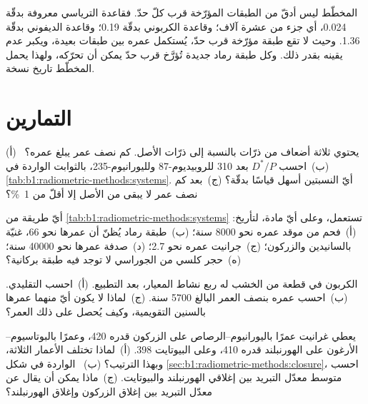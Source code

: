 المخطّط ليس أدقّ من الطبقات المؤرّخة قرب كلّ حدّ. فقاعدة الترياسي معروفة بدقّة \qty{0.024}{\Myr}، أي جزء من عشرة آلاف؛ وقاعدة الكربوني بدقّة \qty{0.19}{\Myr}؛ وقاعدة الديفوني بدقّة \qty{1.36}{\Myr}. وحيث لا تقع طبقة مؤرّخة قرب حدّ، يُستكمل عمره بين طبقات بعيدة، ويكبر عدم يقينه بقدر ذلك. وكل طبقة رماد جديدة تُؤرَّخ قرب حدّ يمكن أن تحرّكه، ولهذا يحمل المخطّط تاريخ نسخة.

\section{التمارين}

\begin{exercise}[$\star$]\label{exo:b1:radiometric-methods:1}
(أ)~ يحتوي ثلاثة أضعاف من ذرّات  بالنسبة إلى ذرّات الأصل. كم نصف عمر يبلغ عمره؟ (ب)~احسب $D^*/P$ بعد \qty{310}{\Myr} للروبيديوم-87 ولليورانيوم-235، بالثوابت الواردة في \cref{tab:b1:radiometric-methods:systems}. أيّ النسبتين أسهل قياسًا بدقّة؟ (ج)~بعد كم نصف عمر لا يبقى من الأصل إلا أقلّ من \qty{1}{\percent}؟
\end{exercise}

\begin{exercise}[$\star$]\label{exo:b1:radiometric-methods:2}
أيّ طريقة من \cref{tab:b1:radiometric-methods:systems} تستعمل، وعلى أيّ مادة، لتأريخ: (أ)~فحم من موقد عمره نحو \num{8000} سنة؛ (ب)~طبقة رماد يُظنّ أن عمرها نحو \qty{66}{\Ma}، غنيّة بالسانيدين والزركون؛ (ج)~جرانيت عمره نحو \qty{2.7}{\Ga}؛ (د)~صدفة عمرها نحو \num{40000} سنة؛ (ه)~حجر كلسي من الجوراسي لا توجد فيه طبقة بركانية؟
\end{exercise}

\begin{exercise}[$\star$]\label{exo:b1:radiometric-methods:3}
الكربون في قطعة من الخشب له ربع نشاط المعيار، بعد التطبيع. (أ)~احسب  التقليدي. (ب)~احسب عمره بنصف العمر البالغ \num{5700} سنة. (ج)~لماذا لا يكون أيّ منهما عمرها بالسنين التقويمية، وكيف يُحصل على ذلك العمر؟
\end{exercise}

\begin{exercise}[$\star$]\label{exo:b1:radiometric-methods:4}
يعطي غرانيت عمرًا باليورانيوم–الرصاص على الزركون قدره \qty{420}{\Ma}، وعمرًا بالبوتاسيوم–الأرغون على الهورنبلند قدره \qty{410}{\Ma}، وعلى البيوتايت \qty{398}{\Ma}. (أ)~لماذا تختلف الأعمار الثلاثة، وبهذا الترتيب؟ (ب)~ الواردة في شكل \cref{sec:b1:radiometric-methods:closure}، احسب متوسط معدّل التبريد بين إغلاقي الهورنبلند والبيوتايت. (ج)~ماذا يمكن أن يقال عن معدّل التبريد بين إغلاق الزركون وإغلاق الهورنبلند؟
\end{exercise}

